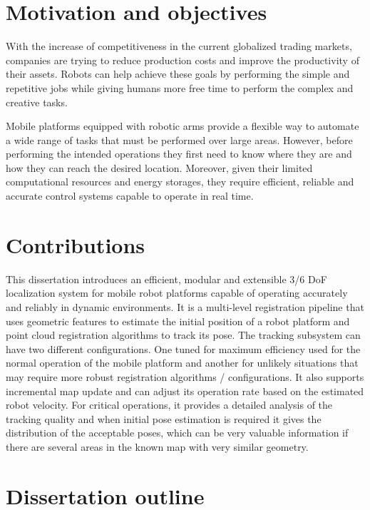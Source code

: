\section{Motivation and objectives} \label{sec:introduction_goals}

With the increase of competitiveness in the current globalized trading markets, companies are trying to reduce production costs and improve the productivity of their assets. Robots can help achieve these goals by performing the simple and repetitive jobs while giving humans more free time to perform the complex and creative tasks.

Mobile platforms equipped with robotic arms provide a flexible way to automate a wide range of tasks that must be performed over large areas. However, before performing the intended operations they first need to know where they are and how they can reach the desired location. Moreover, given their limited computational resources and energy storages, they require efficient, reliable and accurate control systems capable to operate in real time.



\section{Contributions} \label{sec:introduction_contributions}

This dissertation introduces an efficient, modular and extensible 3/6 DoF localization system for mobile robot platforms capable of operating accurately and reliably in dynamic environments. It is a multi-level registration pipeline that uses geometric features to estimate the initial position of a robot platform and point cloud registration algorithms to track its pose. The tracking subsystem can have two different configurations. One tuned for maximum efficiency used for the normal operation of the mobile platform and another for unlikely situations that may require more robust registration algorithms / configurations. It also supports incremental map update and can adjust its operation rate based on the estimated robot velocity. For critical operations, it provides a detailed analysis of the tracking quality and when initial pose estimation is required it gives the distribution of the acceptable poses, which can be very valuable information if there are several areas in the known map with very similar geometry.



\section{Dissertation outline} \label{sec:introduction_structure}

